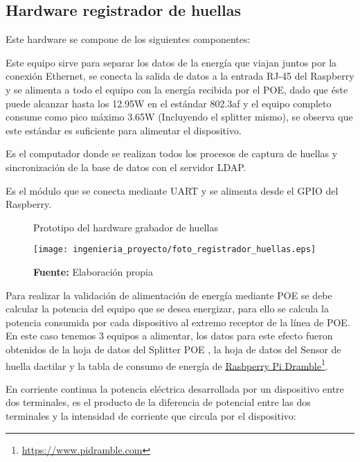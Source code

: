 \documentclass[../principal]{subfiles}
\begin{document}
  \subsection{Hardware registrador de huellas}

  Este hardware se compone de los siguientes componentes:
  \begin{description}[align=left]
    \item[Splitter POE:] Este equipo sirve para separar los datos de la energía que viajan juntos por la conexión Ethernet, se conecta la salida de datos a la entrada RJ-45 del Raspberry y se alimenta a todo el equipo con la energía recibida por el POE, dado que éste puede alcanzar hasta los 12.95W en el estándar 802.3af y el equipo completo consume como pico máximo 3.65W (Incluyendo el splitter mismo), se observa que este estándar es suficiente para alimentar el dispositivo.
    \item[Raspberry:] Es el computador donde se realizan todos los procesos de captura de huellas y sincronización de la base de datos con el servidor LDAP.
    \item[Sensor dactilar ZFM-20:] Es el módulo que se conecta mediante UART y se alimenta desde el GPIO del Raspberry.
  \end{description}

  \begin{figure}[h]
    \centering
    \caption{Prototipo del hardware grabador de huellas}
    \texttt{[image: ingenieria\_proyecto/foto\_registrador\_huellas.eps]}
    \caption*{\textbf{Fuente:} Elaboración propia}
    \label{fig:prototipo_registrador}
  \end{figure}

  Para realizar la validación de alimentación de energía mediante POE se debe calcular la potencia del equipo que se desea energizar, para ello se calcula la potencia consumida por cada dispositivo al extremo receptor de la línea de POE. En este caso tenemos 3 equipos a alimentar, los datos para este efecto fueron obtenidos de la hoja de datos del Splitter POE \cite{datasheet:TL-POE10R_V4}, la hoja de datos del Sensor de huella dactilar \cite{manual:fingerprint_ZFM-20} y la tabla de consumo de energía de \href{https://www.pidramble.com/wiki/benchmarks/power-consumption}{Rasbperry Pi Dramble}\footnote{\href{https://www.pidramble.com/wiki/benchmarks/power-consumption}{https://www.pidramble.com}}.

  En corriente continua la potencia eléctrica desarrollada por un dispositivo entre dos terminales, es el producto de la diferencia de potencial entre las dos terminales y la intensidad de corriente que circula por el dispositivo:
\end{document}
